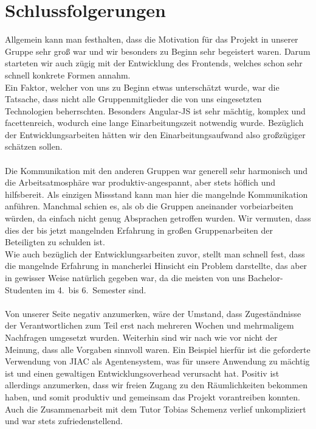 \documentclass[10pt,a4paper]{report}
\begin{document}
\section{Schlussfolgerungen}
Allgemein kann man festhalten, dass die Motivation für das Projekt in unserer Gruppe sehr groß war und wir besonders zu Beginn sehr begeistert waren. Darum starteten wir auch zügig mit der Entwicklung des Frontends, welches schon sehr schnell konkrete Formen annahm.\\
Ein Faktor, welcher von uns zu Beginn etwas unterschätzt wurde, war die Tatsache, dass nicht alle Gruppenmitglieder die von uns eingesetzten Technologien beherrschten. Besonders Angular-JS ist sehr mächtig, komplex und facettenreich, wodurch eine lange Einarbeitungszeit notwendig wurde. Bezüglich der Entwicklungsarbeiten hätten wir den Einarbeitungsaufwand also großzügiger schätzen sollen.\\\\
Die Kommunikation mit den anderen Gruppen war generell sehr harmonisch und die Arbeitsatmosphäre war produktiv-angespannt, aber stets höflich und hilfsbereit. Als einzigen Missstand kann man hier die mangelnde Kommunikation anführen. Manchmal schien es, als ob die Gruppen aneinander vorbeiarbeiten würden, da einfach nicht genug Absprachen getroffen wurden. Wir vermuten, dass dies der bis jetzt mangelnden Erfahrung in großen Gruppenarbeiten der Beteiligten zu schulden ist.\\
Wie auch bezüglich der Entwicklungsarbeiten zuvor, stellt man schnell fest, dass die mangelnde Erfahrung in mancherlei Hinsicht ein Problem darstellte, das aber in gewisser Weise natürlich gegeben war, da die meisten von uns Bachelor-Studenten im 4.~bis 6.~Semester sind.\\\\
Von unserer Seite negativ anzumerken, wäre der Umstand, dass Zugeständnisse der Verantwortlichen zum Teil erst nach mehreren Wochen und mehrmaligem Nachfragen umgesetzt wurden. Weiterhin sind wir nach wie vor nicht der Meinung, dass alle Vorgaben sinnvoll waren. Ein Beispiel hierfür ist die geforderte Verwendung von JIAC als Agentensystem, was für unsere Anwendung zu mächtig ist und einen gewaltigen Entwicklungsoverhead verursacht hat. Positiv ist allerdings anzumerken, dass wir freien Zugang zu den Räumlichkeiten bekommen haben, und somit produktiv und gemeinsam das Projekt vorantreiben konnten. Auch die Zusammenarbeit mit dem Tutor Tobias Schemenz verlief unkompliziert und war stets zufriedenstellend.\\\\
\end{document}
